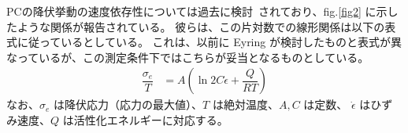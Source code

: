 \documentclass[uplatex,dvipdfmx,a4paper,10pt]{jsarticle}
\begin{document}
PCの降伏挙動の速度依存性については過去に検討~\cite{bauwens}されており、fig.\ref{fig2} に示したような関係が報告されている。
彼らは、この片対数での線形関係は以下の表式に従っているとしている。
これは、以前に Eyring が検討したものと表式が異なっているが、この測定条件下ではこちらが妥当となるものとしている。
\begin{align}
	\dfrac{\sigma_e}{T} 
		&= A \left(\ln 2 C \dot{\epsilon} + \dfrac{Q}{RT} \right)
	 \label{eq1}
\end{align}
なお、$\sigma_e$ は降伏応力（応力の最大値）、$T$ は絶対温度、$A, C$ は定数、 $\dot{\epsilon}$ はひずみ速度、$Q$ は活性化エネルギーに対応する。

\end{document}
